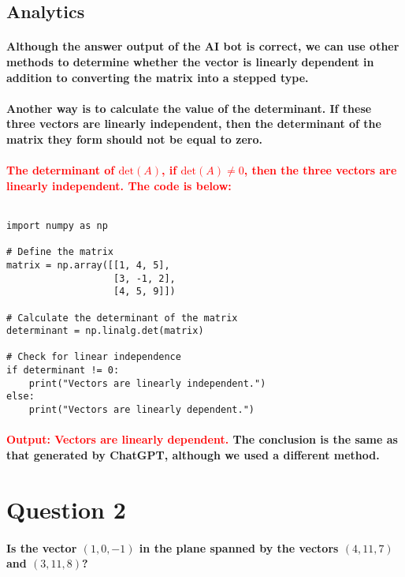 \documentclass[11pt]{article} %
\begin{document}
\subsection{Analytics}
% 
% 
\paragraph{Although the answer output of the AI bot is correct, we can use other methods to determine whether the vector is linearly dependent in addition to converting the matrix into a stepped type.}
% 
% 
% 
\paragraph{Another way is to calculate the value of the determinant. If these three vectors are linearly independent, then the determinant of the matrix they form should not be equal to zero.}
% 
% 
% 
% 
\paragraph{\textcolor{red}{The determinant of \( \text{det}(A) \), if  \( \text{det}(A) \neq 0 \), then the three vectors are linearly independent. The code is below: }}
% 
% 
$$$$
% 
\begin{lstlisting}[style=pystyle]
import numpy as np

# Define the matrix
matrix = np.array([[1, 4, 5],
                   [3, -1, 2],
                   [4, 5, 9]])

# Calculate the determinant of the matrix
determinant = np.linalg.det(matrix)

# Check for linear independence
if determinant != 0:
    print("Vectors are linearly independent.")
else:
    print("Vectors are linearly dependent.")
\end{lstlisting}
% 
% 
\paragraph{\textcolor{red}{Output: Vectors are linearly dependent.} The conclusion is the same as that generated by ChatGPT, although we used a different method.}
% 
% 
% 
% 
% 
% 
% 
% 
% 
% 
% 
% 
% 
% 
% 
% 
% 
% 
% 
\section{Question 2}
% 
\paragraph{Is the vector $(1,0,-1)$ in the plane spanned by the vectors $(4,11,7)$ and $(3,11,8)$?}
% 
% 
\end{document}
